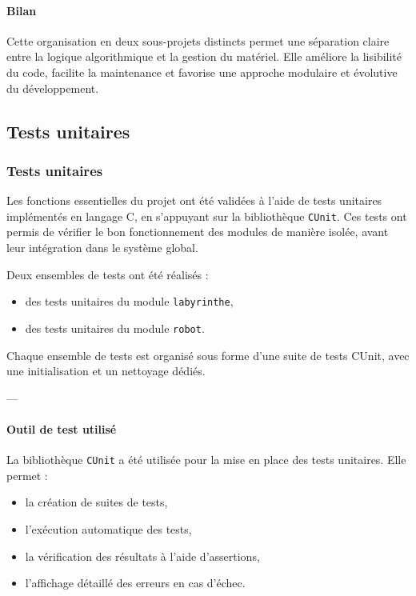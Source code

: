 \paragraph{Bilan}

Cette organisation en deux sous-projets distincts permet une séparation claire entre la logique algorithmique
et la gestion du matériel. Elle améliore la lisibilité du code, facilite la maintenance
et favorise une approche modulaire et évolutive du développement.

\subsection{Tests unitaires}
\subsubsection{Tests unitaires}

Les fonctions essentielles du projet ont été validées à l’aide de tests unitaires
implémentés en langage C, en s’appuyant sur la bibliothèque \texttt{CUnit}.
Ces tests ont permis de vérifier le bon fonctionnement des modules de manière isolée,
avant leur intégration dans le système global.

Deux ensembles de tests ont été réalisés :
\begin{itemize}
    \item des tests unitaires du module \texttt{labyrinthe},
    \item des tests unitaires du module \texttt{robot}.
\end{itemize}

Chaque ensemble de tests est organisé sous forme d’une suite de tests CUnit,
avec une initialisation et un nettoyage dédiés.

---

\paragraph{Outil de test utilisé}

La bibliothèque \texttt{CUnit} a été utilisée pour la mise en place des tests unitaires.
Elle permet :
\begin{itemize}
    \item la création de suites de tests,
    \item l’exécution automatique des tests,
    \item la vérification des résultats à l’aide d’assertions,
    \item l’affichage détaillé des erreurs en cas d’échec.
\end{itemize}

